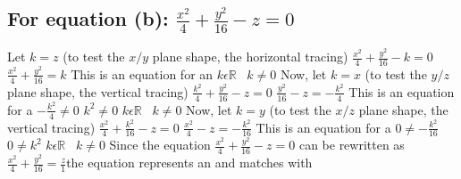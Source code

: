 \documentclass{article}
\begin{document}
\begin{multicols*}{2}
\subsection*{For equation (b): $ \frac{x^2}{4}+\frac{y^2}{16}-z=0$}
Let $k=z$ (to test the $x/y$ plane shape, the horizontal tracing)
\vfill$ \frac{x^2}{4}+\frac{y^2}{16}-k=0$
\vfill$ \frac{x^2}{4}+\frac{y^2}{16}=k$ This is an equation for an 
\vfill$ k \epsilon \mathbb{R} \;\;\; k \neq 0$
\vfill Now, let $k=x$ (to test the $y/z$ plane shape, the vertical tracing)
\vfill$ \frac{k^2}{4}+\frac{y^2}{16}-z=0$
\vfill$ \frac{y^2}{16}-z=-\frac{k^2}{4}$ This is an equation for a 
\vfill$-\frac{k^2}{4} \neq 0$
\vfill${k^2} \neq 0$
\vfill$k \epsilon \mathbb{R} \;\;\;k \neq 0$
\vfill Now, let $k=y$ (to test the $x/z$ plane shape, the vertical tracing) 
\vfill $ \frac{x^2}{4}+\frac{k^2}{16}-z=0$
\vfill$ \frac{x^2}{4}-z=-\frac{k^2}{16}$ This is an equation for a 
\vfill$ 0 \neq -\frac{k^2}{16}$
\vfill$ 0 \neq k^2$
\vfill$ k \epsilon \mathbb{R} \;\;\; k \neq 0$
\vfill Since the equation $ \frac{x^2}{4}+\frac{y^2}{16}-z=0$ can be rewritten as $ \frac{x^2}{4}+\frac{y^2}{16}=\frac{z}{1}$the equation represents an  and matches with \\[2in]
\end{multicols*}
\end{document}
